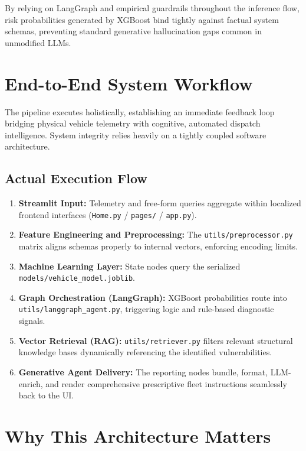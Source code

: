 \documentclass[12pt, a4paper]{article}
\begin{document}
By relying on LangGraph and empirical guardrails throughout the inference flow, risk probabilities generated by XGBoost bind tightly against factual system schemas, preventing standard generative hallucination gaps common in unmodified LLMs.

\newpage
\section{End-to-End System Workflow}

The pipeline executes holistically, establishing an immediate feedback loop bridging physical vehicle telemetry with cognitive, automated dispatch intelligence. System integrity relies heavily on a tightly coupled software architecture.

\subsection{Actual Execution Flow}

\begin{enumerate}
    \item \textbf{Streamlit Input:} Telemetry and free-form queries aggregate within localized frontend interfaces (\texttt{Home.py} / \texttt{pages/} / \texttt{app.py}).
    \item \textbf{Feature Engineering and Preprocessing:} The \texttt{utils/preprocessor.py} matrix aligns schemas properly to internal vectors, enforcing encoding limits.
    \item \textbf{Machine Learning Layer:} State nodes query the serialized \texttt{models/vehicle\_model.joblib}.
    \item \textbf{Graph Orchestration (LangGraph):} XGBoost probabilities route into \texttt{utils/langgraph\_agent.py}, triggering logic and rule-based diagnostic signals.
    \item \textbf{Vector Retrieval (RAG):} \texttt{utils/retriever.py} filters relevant structural knowledge bases dynamically referencing the identified vulnerabilities.
    \item \textbf{Generative Agent Delivery:} The reporting nodes bundle, format, LLM-enrich, and render comprehensive prescriptive fleet instructions seamlessly back to the UI.
\end{enumerate}

\section{Why This Architecture Matters}
\end{document}
